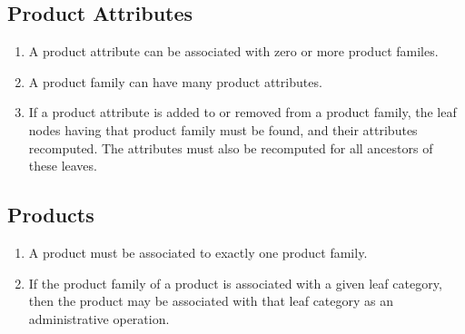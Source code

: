 \documentclass[letterpaper, 12pt]{article}
\begin{document}
\subsection{Product Attributes}
\begin{enumerate}
\item A product attribute can be associated with zero or more product familes.
\item A product family can have many product attributes.
\item If a product attribute is added to or removed from a product family, the leaf nodes having that product family must be found, and their attributes recomputed.  The attributes must also be recomputed for all ancestors of these leaves.
\end{enumerate}
\subsection{Products}
\begin{enumerate}
\item A product must be associated to exactly one product family.
\item If the product family of a product is associated with a given leaf category, then the product may be associated with that leaf category as an administrative operation.
\end{enumerate}
\end{document}
